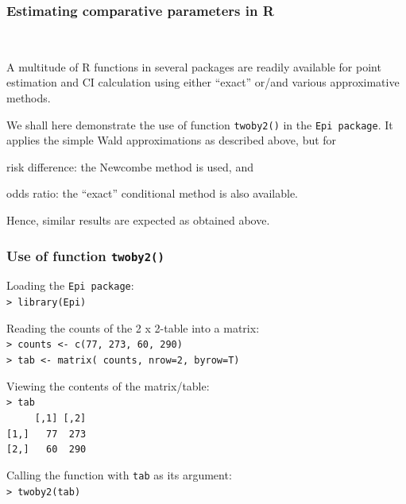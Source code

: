 \documentclass[handout,12pt]{beamer}
\begin{document}

\begin{frame}[fragile] \frametitle{Estimating comparative parameters in R}
\ \\
\bi
\item A multitude of R functions in several packages are readily available for point estimation and CI calculation using either ``exact'' or/and various approximative methods.
\medskip
\item We shall here demonstrate the use of function {\tt twoby2()} in the {\tt Epi package}.  It applies the simple Wald approximations as described above, but for 
  \bi
  \item risk difference: the Newcombe method is used, and 
  \item odds ratio: the ``exact'' conditional method is also available.
  \ei
\item[ ] Hence, similar results are expected as obtained above.
\ei
\end{frame}


\begin{frame}[fragile] \frametitle{Use of function {\tt twoby2()}}
\bi
\item Loading the {\tt Epi package}:\\
\verb|> library(Epi)| \medskip
\item Reading the counts of the 2 x 2-table into a matrix: \\
\verb|> counts <- c(77, 273, 60, 290)| \\
\verb|> tab <- matrix( counts, nrow=2, byrow=T)|\medskip
\item Viewing the contents of the matrix/table: \\
\verb|> tab| \\
\verb|     [,1] [,2]| \\
\verb|[1,]   77  273| \\
\verb|[2,]   60  290| \medskip
\item Calling the function with {\tt tab} as its argument: \\
\verb|> twoby2(tab)|
\ei
\end{frame}

\end{document}
